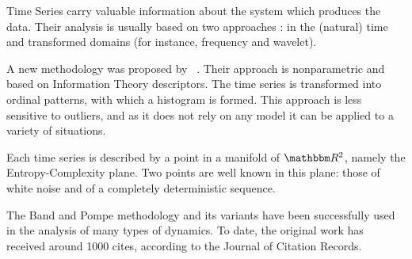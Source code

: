 \documentclass[sts]{imsart}
\begin{document}
Time Series carry valuable information about the system which produces the data.
Their analysis is usually based on two approaches \cite{TimeSeriesAnalysisCryerChan}: in the (natural) time and transformed domains (for instance, frequency and wavelet).

A new methodology was proposed by \citeauthor{PermutationEntropyBandtPompe}~.
Their approach is nonparametric and based on Information Theory descriptors.
The time series is transformed into ordinal patterns, with which a histogram is formed.
This approach is less sensitive to outliers, and as it does not rely on any model it can be applied to a variety of situations.

Each time series is described by a point in a manifold of $\mathbbm R^2$, namely the Entropy-Complexity plane.
Two points are well known in this plane: those of white noise and of a completely deterministic sequence.

The Band and Pompe methodology and its variants have been successfully used in the analysis of many types of dynamics.
To date, the original work has received around \num{1000} cites, according to the Journal of Citation Records.
\end{document}
